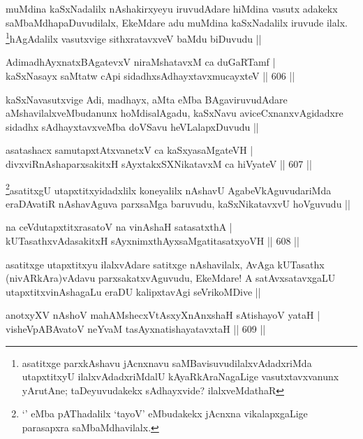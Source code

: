 \begin{artha}
muMdina kaSxNadalilx nAshakirxyeyu iruvudAdare hiMdina vasutx adakekx saMbaMdhapaDuvudilalx, EkeMdare adu muMdina kaSxNadalilx iruvude ilalx. \footnote{asatitxge parxkAshavu jAcnxnavu saMBavisuvudilalxvAdadxriMda utapxtitxyU ilalxvAdadxriMdalU kAyaRkAraNagaLige vasutxtavxvanunx yArutAne; taDeyuvudakekx sAdhayxvide? ilalxveMdathaR}hAgAdalilx vasutxvige sithxratavxveV baMdu biDuvudu ||
\end{artha}

\begin{shl}
AdimadhAyxnatxBAgatevxV niraMshatavxM ca duGaRTamf | \\
kaSxNasayx saMtatw cApi sidadhxsAdhayxtavxmucayxteV \hfill||  606 ||  
\end{shl}

\begin{artha}
kaSxNavasutxvige Adi, madhayx, aMta eMba BAgaviruvudAdare aMshavilalxveMbudanunx hoMdisalAgadu, kaSxNavu aviceCxnanxvAgidadxre sidadhx sAdhayxtavxveMba doVSavu heVLalapxDuvudu ||
\end{artha}

\begin{shl}
asatashacx samutapxtAtxvanetxV ca kaSxyasaMgateVH | \\
divxviRnAshaparxsakitxH sAyxtakxSXNikatavxM ca hiVyateV \hfill||  607 ||  
\end{shl}	

\begin{artha}
\footnote{`\stext' eMba pAThadalilx `tayoV' eMbudakekx jAcnxna vikalapxgaLige parasapxra saMbaMdhavilalx.}asatitxgU utapxtitxyidadxlilx koneyalilx nAshavU AgabeVkAguvudariMda eraDAvatiR nAshavAguva parxsaMga baruvudu, kaSxNikatavxvU hoVguvudu ||
\end{artha}

\begin{shl}
na ceVdutapxtitxrasatoV na vinAshaH satasatxthA | \\
kUTasathxvAdasakitxH sAyxnimxthAyxsaMgatitasatxyoVH \hfill||  608 ||  
\end{shl}

\begin{artha}
asatitxge utapxtitxyu ilalxvAdare satitxge nAshavilalx, AvAga kUTasathx (nivARkAra)vAdavu parxsakatxvAguvudu, EkeMdare! A satAvxsatavxgaLU utapxtitxvinAshagaLu eraDU kalipxtavAgi seVrikoMDive ||
\end{artha}

\begin{shl}
anotxyXV nAshoV mahAMshecxVtAsxyXnAnxshaH sAtishayoV yataH | \\
visheVpABAvatoV neYvaM tasAyxnatishayatavxtaH \hfill||  609 || 
\end{shl}

